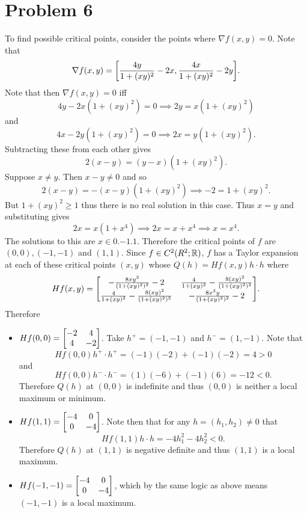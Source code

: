 \documentclass{eeleyes}
\begin{document}
\section*{Problem 6}
To find possible critical points, consider the points where $\nabla f(x,y) = 0$. Note that
\[
    \nabla f(x,y) = \qty[\frac{4y}{1 + (xy)^2} - 2x, \frac{4x}{1 + (xy)^2} - 2y]
.\]
Note that then $\nabla f(x,y) = 0$ iff
\[
    4y - 2x(1 + (xy)^2) = 0 \implies 2y = x(1 + (xy)^2)
\]
and
\[
    4x - 2y(1 + (xy)^2) = 0 \implies 2x = y(1+ (xy)^2)
.\]
Subtracting these from each other gives
\[
    2(x-y) = (y - x)(1 + (xy)^2)
.\]
Suppose $x \neq y$. Then $x - y \neq 0$ and so
\[
    2(x-y) = -(x-y) (1 + (xy)^2) \implies -2 = 1 + (xy)^2
.\]
But $1 + (xy)^2 \geq 1$ thus there is no real solution in this case. Thus $x = y$ and substituting gives
\[
    2x = x (1+x^4) \implies 2x = x + x^4 \implies x = x^4
.\]
The solutions to this are $x \in \qty{0, -1, 1}$. Therefore the critical points of $f$ are $(0,0), (-1, -1)$ and $(1,1)$. Since $f \in C^2(R^2; \mathbb{R})$, $f$ has a Taylor expansion at each of these critical points $(x,y)$ whose $Q(h) = Hf(x,y) h \cdot h$ where
\[
    Hf(x,y) = \mqty[
        -\frac{8xy^3}{(1 + (xy)^2)^2} - 2 & \frac{4}{1 + (xy)^2} - \frac{8(xy)^2}{(1+(xy)^2)^2} \\
        \frac{4}{1 + (xy)^2} - \frac{8(xy)^2}{(1+(xy)^2)^2} & -\frac{8x^3y}{(1 + (xy)^2)^2} - 2
    ]
.\]
Therefore
\begin{itemize}
    \item $Hf(0,0) = \mqty[-2 & 4 \\ 4 & -2]$. Take $h^{+} = (-1, -1)$ and $h^{-} = (1,-1)$. Note that
        \[
            Hf(0,0) h^{+} \cdot h^{+} = (-1)(-2) + (-1)(-2) = 4 > 0
        \]
        and
        \[
            Hf(0,0) h^{-} \cdot h^{-} = (1)(-6) + (-1)(6) = -12 < 0
        .\]
        Therefore $Q(h)$ at $(0,0)$ is indefinite and thus $(0,0)$ is neither a local maximum or minimum.
    \item $Hf(1,1) = \mqty[-4 & 0 \\ 0 & -4]$. Note then that for any $h = (h_1, h_2) \neq 0$ that 
        \[
            Hf(1,1) h \cdot h = -4h_1^2 - 4h_2^2 < 0
        .\]
        Therefore $Q(h)$ at $(1,1)$ is negative definite and thus $(1,1)$ is a local maximum.
    \item $Hf(-1,-1) = \mqty[-4 & 0 \\ 0 & -4]$, which by the same logic as above means $(-1, -1)$ is a local maximum.
\end{itemize}
\end{document}

